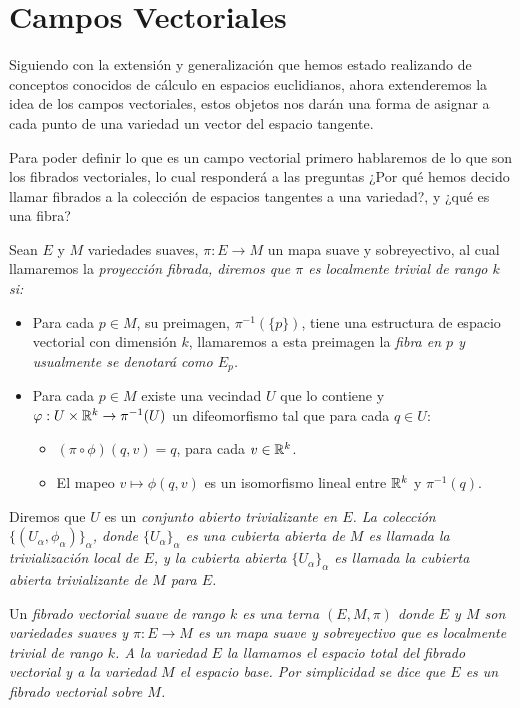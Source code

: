 \section{Campos Vectoriales}\label{Sección: Campos Vectoriales}
Siguiendo con la extensión y generalización que hemos estado realizando de conceptos conocidos de cálculo en espacios euclidianos, ahora extenderemos la idea de los campos vectoriales, estos objetos nos darán una forma de asignar a cada punto de una variedad un vector del espacio tangente.

Para poder definir lo que es un campo vectorial primero hablaremos de lo que son los fibrados vectoriales, lo cual responderá a las preguntas ¿Por qué hemos decido llamar fibrados a la colección de espacios tangentes a una variedad?, y ¿qué es una fibra?

\begin{definition}
	Sean $E$ y $M$ variedades suaves, $\pi: E \to M$ un mapa suave y sobreyectivo, al cual llamaremos la \it{proyección fibrada}, diremos que $\pi$ es \it{localmente trivial de rango $k$} si:

	\begin{itemize}
		\item Para cada $p \in M$, su preimagen, $\pi^{-1}(\{p\})$, tiene una estructura de espacio vectorial con dimensión $k$, llamaremos a esta preimagen la \it{fibra en $p$} y usualmente se denotará como $E_p$.

		\item Para cada $p \in M$ existe una vecindad $U$ que lo contiene y $\varphi: U \times \mathbb{R}^{k} \to \pi^{-1}(U)$ un difeomorfismo tal que para cada $q \in U$:
		      \begin{itemize}
			      \item $(\pi \circ \phi)(q,v) = q$, para cada $v \in \mathbb{R}^{k}$.
			      \item El mapeo $v \mapsto \phi(q,v)$ es un isomorfismo lineal entre $\mathbb{R}^{k}$ y $\pi^{-1}(q)$.
		      \end{itemize}
	\end{itemize}

	Diremos que $U$ es un \it{conjunto abierto trivializante} en $E$. La colección $\{(U_\alpha, \phi_\alpha)\}_{\alpha}$, donde $\{U_{\alpha}\}_{\alpha}$ es una cubierta abierta de $M$ es llamada la trivialización local de $E$, y la cubierta abierta $\{U_\alpha\}_{\alpha}$ es llamada la cubierta abierta trivializante de $M$ para $E$.

	Un \it{fibrado vectorial suave de rango $k$} es una terna $(E,M,\pi)$ donde $E$ y $M$ son variedades suaves y $\pi: E \to M$ es un mapa suave y sobreyectivo que es localmente trivial de rango $k$. A la variedad $E$ la llamamos el \it{espacio total} del fibrado vectorial y a la variedad $M$ el \it{espacio base}. Por simplicidad se dice que $E$ es un fibrado vectorial sobre $M$.
\end{definition}

